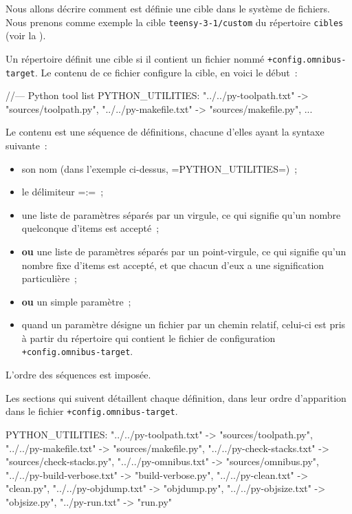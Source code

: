 Nous allons décrire comment est définie une cible dans le système de fichiers. Nous prenons comme exemple la cible \texttt{teensy-3-1/custom} du répertoire \texttt{cibles} (voir la ).

Un répertoire définit une cible si il contient un fichier nommé \texttt{+config.omnibus-target}. Le contenu de ce fichier configure la cible, en voici le début~:

\begin{OMNIBUS}
//--- Python tool list
PYTHON_UTILITIES:
   "../../py-toolpath.txt" -> "sources/toolpath.py",
   "../../py-makefile.txt" -> "sources/makefile.py",
   ...
\end{OMNIBUS}


Le contenu est une séquence de définitions, chacune d'elles ayant la syntaxe suivante~:
\begin{itemize}
  \item son nom (dans l'exemple ci-dessus, \omnibus=PYTHON_UTILITIES=)~;
  \item le délimiteur \omnibus=:=~;
  \item une liste de paramètres séparés par un virgule, ce qui signifie qu'un nombre quelconque d'items est accepté~;
  \item {\bf ou} une liste de paramètres séparés par un point-virgule, ce qui signifie qu'un nombre fixe d'items est accepté, et que chacun d'eux a une signification particulière~;
  \item {\bf ou} un simple paramètre~;
  \item quand un paramètre désigne un fichier par un chemin relatif, celui-ci est pris à partir du répertoire qui contient le fichier de configuration \texttt{+config.omnibus-target}.
\end{itemize}

L'ordre des séquences est imposée.

Les sections qui suivent détaillent chaque définition, dans leur ordre d'apparition dans le fichier \texttt{+config.omnibus-target}.











\begin{OMNIBUS}
PYTHON_UTILITIES:
   "../../py-toolpath.txt" -> "sources/toolpath.py",
   "../../py-makefile.txt" -> "sources/makefile.py",
   "../../py-check-stacks.txt" -> "sources/check-stacks.py",
   "../../py-omnibus.txt" -> "sources/omnibus.py",
   "../../py-build-verbose.txt" -> "build-verbose.py",
   "../../py-clean.txt" -> "clean.py",
   "../../py-objdump.txt" -> "objdump.py",
   "../../py-objsize.txt" -> "objsize.py",
   "../py-run.txt" -> "run.py"
\end{OMNIBUS}

